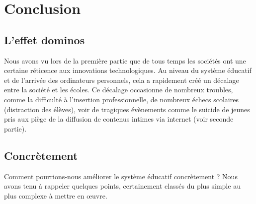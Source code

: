 
\part{Conclusion}\label{conclu}

\chapter*{L'effet dominos}
Nous avons vu lors de la première partie que de tous temps les sociétés ont une certaine réticence aux innovations technologiques. Au niveau du système éducatif et de l'arrivée des ordinateurs personnels, cela a rapidement créé un décalage entre la société et les écoles. Ce décalage occasionne de nombreux troubles, comme la difficulté à l'insertion professionnelle, de nombreux échecs scolaires (distraction des élèves), voir de tragiques évènements comme le suicide de jeunes pris aux piège de la diffusion de contenus intimes via internet (voir seconde partie).

\chapter*{Concrètement}
Comment pourrions-nous améliorer le système éducatif concrètement ? Nous avons tenu à rappeler quelques points, certainement classés du plus simple au plus complexe à mettre en œuvre.


